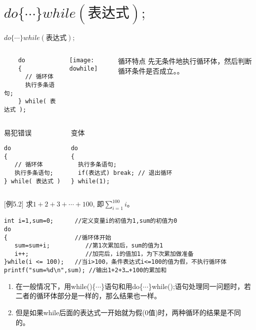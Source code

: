 \section{$do \{\cdots\} while(\text{表达式});$}

\begin{frame}{$do \{\cdots\} while(\text{表达式});$}
\begin{columns}
	\begin{lstlisting} 
    do  
    {
      // 循环体
      执行多条语句;  
    } while( 表达式 );  
    \end{lstlisting}
	\texttt{[image: dowhile]}
	\begin{block}{循环特点}
		先无条件地执行循环体，然后判断循环条件是否成立。。
	\end{block}
\end{columns}
\begin{columns}
\begin{block}{易犯错误}
\begin{lstlisting} 
do  
{
   // 循环体
   执行多条语句;  
} while( 表达式 )
\end{lstlisting}
\end{block}
\begin{block}{变体}
\begin{lstlisting} 
do  
{
  执行多条语句;  
  if(表达式) break; // 退出循环  
} while(1);
\end{lstlisting}
\end{block}
\end{columns}
\end{frame}

\begin{frame}
$[$例5.2$]$ 求$1+2+3+\cdots+100$, 即$\sum\limits_{i=1}^{100}i$。
\begin{lstlisting}
int i=1,sum=0;      //定义变量i的初值为1,sum的初值为0  
do     
{                   //循环体开始
   sum=sum+i;          //第1次累加后，sum的值为1
   i++;                //加完后，i的值加1，为下次累加做准备
}while(i <= 100);   //当i>100，条件表达式i<=100的值为假，不执行循环体
printf("sum=%d\n",sum); //输出1+2+3…+100的累加和                
\end{lstlisting}
\begin{enumerate}
	\setlength{\itemsep}{.2cm}
	\item 在一般情况下，用while()\{$\cdots$\}语句和用do\{$\cdots$\}while();语句处理同一问题时，若二者的循环体部分是一样的，那么结果也一样。
	\item 但是如果while后面的表达式一开始就为假(0值)时，两种循环的结果是不同的。
\end{enumerate}
\end{frame}

